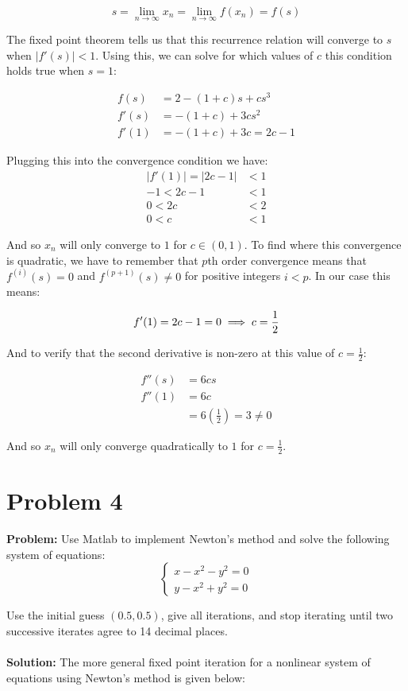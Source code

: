 \documentclass{article}
\begin{document}
$$s=\lim_{n\to\infty}x_n=\lim_{n\to\infty}f(x_n)=f(s)$$

The fixed point theorem tells us that this recurrence relation will converge to $s$ when $|f'(s)|<1$. Using this, we can solve for which values of $c$ this condition holds true when $s=1$:

\begin{align*}
f(s)&=2-(1+c)s+cs^3\\
f'(s)&=-(1+c)+3cs^2\\
f'(1)&=-(1+c)+3c=2c-1
\end{align*}

Plugging this into the convergence condition we have:
\begin{align*}
|f'(1)|=|2c-1|&<1\\
-1<2c-1&<1\\
0<2c&<2\\
0<c&<1
\end{align*}

And so $x_{n}$ will only converge to $1$ for $c\in(0,1)$. To find where this convergence is quadratic, we have to remember that $p$th order convergence means that $f^{(i)}(s)=0$ and $f^{(p+1)}(s)\not=0$ for positive integers $i<p$. In our case this means:

$$f'(1)=2c-1=0\implies c=\frac{1}{2}\\$$

And to verify that the second derivative is non-zero at this value of $c=\frac{1}{2}$:

\begin{align*}
  f''(s)&=6cs\\
  f''(1)&=6c\\
  &=6\left(\frac{1}{2}\right)=3\not=0
\end{align*}

And so $x_{n}$ will only converge quadratically to $1$ for $c=\frac{1}{2}$.

\section*{Problem 4}
\textbf{Problem:} Use Matlab to implement Newton's method and solve the following system of equations:
$$\begin{cases}
  x-x^2-y^2=0\\
  y-x^2+y^2=0
\end{cases}$$

Use the initial guess $(0.5,0.5)$, give all iterations, and stop iterating until two successive iterates agree to 14 decimal places.
\\\\
\textbf{Solution:} The more general fixed point iteration for a nonlinear system of equations using Newton's method is given below:
\end{document}
